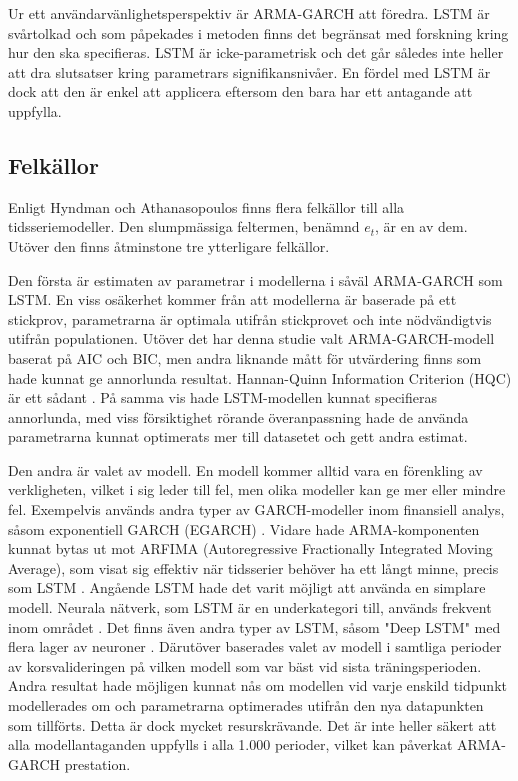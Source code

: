 \documentclass[11pt]{article}
\numberwithin{equation}{section}
\numberwithin{table}{section}
\numberwithin{figure}{section}
\begin{document}
Ur ett användarvänlighetsperspektiv är ARMA-GARCH att föredra. LSTM är svårtolkad och som påpekades i metoden finns det begränsat med forskning kring hur den ska specifieras. LSTM är icke-parametrisk och det går således inte heller att dra slutsatser kring parametrars signifikansnivåer. En fördel med LSTM är dock att den är enkel att applicera eftersom den bara har ett antagande att uppfylla. 

\subsection{Felkällor}
Enligt Hyndman och Athanasopoulos \parencite*[][,s.452 f.]{hyndman2018forecasting} finns flera felkällor till alla tidsseriemodeller. Den slumpmässiga feltermen, benämnd \(e_t\), är en av dem. Utöver den finns åtminstone tre ytterligare felkällor. 

Den första är estimaten av parametrar i modellerna i såväl ARMA-GARCH som LSTM. En viss osäkerhet kommer från att modellerna är baserade på ett stickprov, parametrarna är optimala utifrån stickprovet och inte nödvändigtvis utifrån populationen. Utöver det har denna studie valt ARMA-GARCH-modell baserat på AIC och BIC, men andra liknande mått för utvärdering finns som hade kunnat ge annorlunda resultat. Hannan-Quinn Information Criterion (HQC) är ett sådant \parencite{hannan1979determination}. På samma vis hade LSTM-modellen kunnat specifieras annorlunda, med viss försiktighet rörande överanpassning hade de använda parametrarna kunnat optimerats mer till datasetet och gett andra estimat.

Den andra är valet av modell. En modell kommer alltid vara en förenkling av verkligheten, vilket i sig leder till fel, men olika modeller kan ge mer eller mindre fel. Exempelvis används andra typer av GARCH-modeller inom finansiell analys, såsom exponentiell GARCH (EGARCH) \parencite{nelson1991conditional}. Vidare hade ARMA-komponenten kunnat bytas ut mot ARFIMA (Autoregressive Fractionally Integrated Moving Average), som visat sig effektiv när tidsserier behöver ha ett långt minne, precis som LSTM \parencite{taqqu1995estimators}. Angående LSTM hade det varit möjligt att använda en simplare modell. Neurala nätverk, som LSTM är en underkategori till, används frekvent inom området \parencite[se t.ex.][]{rather2015recurrent}. Det finns även andra typer av LSTM, såsom "Deep LSTM" med flera lager av neuroner \parencite[se applikation i][]{hansson2017stock}. Därutöver baserades valet av modell i samtliga perioder av korsvalideringen på vilken modell som var bäst vid sista träningsperioden. Andra resultat hade möjligen kunnat nås om modellen vid varje enskild tidpunkt modellerades om och parametrarna optimerades utifrån den nya datapunkten som tillförts. Detta är dock mycket resurskrävande. Det är inte heller säkert att alla modellantaganden uppfylls i alla 1.000 perioder, vilket kan påverkat ARMA-GARCH prestation. 
\end{document}
